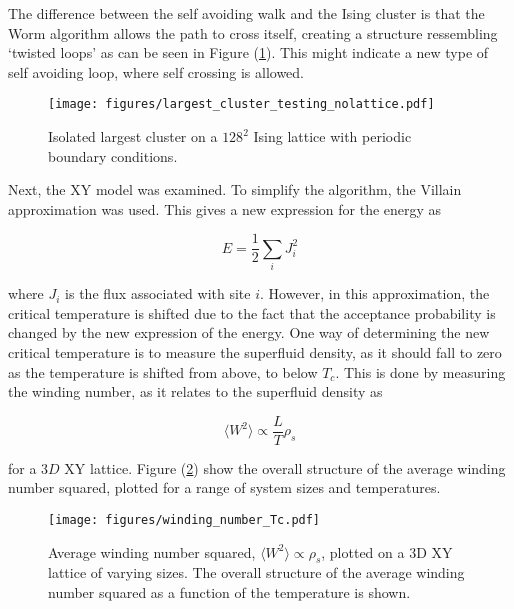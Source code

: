 \noindent The difference between the self avoiding walk and the Ising cluster is that the Worm algorithm allows the path to cross itself, creating a structure ressembling `twisted loops' as can be seen in Figure (\ref{fig:largest_cluster_illu}). This might indicate a new type of self avoiding loop, where self crossing is allowed.

\begin{figure}[h!]
    \centering
        \texttt{[image: figures/largest\_cluster\_testing\_nolattice.pdf]}
    \caption{Isolated largest cluster on a $128^2$ Ising lattice with periodic boundary conditions.}
    \label{fig:largest_cluster_illu}
\end{figure}

\newpage

Next, the XY model was examined. To simplify the algorithm, the Villain approximation \cite{Villain:VillainOriginalPaper} was used. This gives a new expression for the energy as

\begin{equation}
    E = \frac{1}{2} \sum_i J^2_i
\label{eq:results_villain_energy}
\end{equation}

where $J_i$ is the flux associated with site $i$. However, in this approximation, the critical temperature is shifted due to the fact that the acceptance probability is changed by the new expression of the energy. One way of determining the new critical temperature is to measure the superfluid density, as it should fall to zero as the temperature is shifted from above, to below $T_c$. This is done by measuring the winding number, as it relates to the superfluid density as

\begin{equation}
    \langle W^2 \rangle \propto \frac{L}{T} \rho_s
\end{equation}

for a $3D$ XY lattice. Figure (\ref{fig:results_windingnumberTc}) show the overall structure of the average winding number squared, plotted for a range of system sizes and temperatures.

\begin{figure}[h!]
    \centering
        \texttt{[image: figures/winding\_number\_Tc.pdf]}
    \caption{Average winding number squared, $\langle W^2 \rangle \propto \rho_s$, plotted on a 3D XY lattice of varying sizes. The overall structure of the average winding number squared as a function of the temperature is shown.}
    \label{fig:results_windingnumberTc}
\end{figure}

